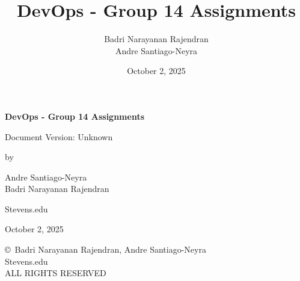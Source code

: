 \documentclass[12pt,a4paper]{report}
\title{DevOps - Group 14 Assignments}
\date{October 2, 2025}
\author{
    Badri Narayanan Rajendran \\
    Andre Santiago-Neyra 
}
\newcommand{\gitversion}{Unknown}
\begin{document}

\begin{titlepage}
    \centering
    \vspace*{5cm}
    
    {\Huge\bfseries DevOps - Group 14 Assignments\par}

    \vspace{0.5cm}
    {\large Document Version: \gitversion\par}
    
    \vspace{1cm}
    
    {\Large by\par}
    
    \vspace{0.5cm}
    
    {\Large
    Andre Santiago-Neyra\\
    Badri Narayanan Rajendran\\
    }
    
    \vspace{1cm}
    
    {\large Stevens.edu\par}
    
    \vfill
    
    {\large October 2, 2025\par}
    
\end{titlepage}

\newpage
\thispagestyle{empty}
\vspace*{\fill}
\begin{center}
    \copyright\ Badri Narayanan Rajendran, Andre Santiago-Neyra\\
    Stevens.edu\\
    ALL RIGHTS RESERVED
\end{center}
\vspace*{\fill}

\clearpage


\clearpage


\tableofcontents

\listoftables

\listoffigures
\end{document}
